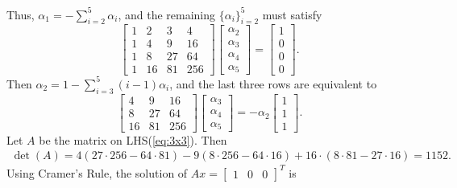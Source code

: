 \documentclass{homework}
\begin{document}
	Thus, $\alpha_1 = -\sum\limits_{i=2}^5 \alpha_i$, and the remaining $\{\alpha_i\}_{i=2}^5$ must satisfy
	\begin{equation}
		\left[\begin{matrix}
			1 & 2 & 3 & 4 \\
			1 & 4 & 9 & 16 \\
			1 & 8 & 27 & 64 \\
			1 & 16 & 81 & 256
		\end{matrix}\right]
		\left[\begin{matrix}
			\alpha_2 \\ \alpha_3 \\ \alpha_4 \\ \alpha_5
		\end{matrix}\right] =
		\left[\begin{matrix}
			1 \\ 0 \\ 0 \\ 0
		\end{matrix}\right].
	\end{equation}
	Then $\alpha_2 = 1-\sum\limits_{i=3}^5 (i-1)\alpha_i$, and the last three rows are equivalent to
	\begin{equation}
		\label{eq:3x3}
		\left[\begin{matrix}
			4 & 9 & 16 \\
			8 & 27 & 64 \\
			16 & 81 & 256
		\end{matrix}\right]\left[\begin{matrix}
		\alpha_3 \\ \alpha_4\\ \alpha_5
		\end{matrix}\right] = -\alpha_2\left[\begin{matrix}
		1\\1\\1
		\end{matrix}\right].
	\end{equation}
	Let $A$ be the matrix on LHS(\ref{eq:3x3}). Then 
	\begin{align*}
		\det(A) = 4(27\cdot 256 - 64\cdot 81) - 9(8 \cdot 256 - 64\cdot 16) + 16\cdot(8\cdot 81 - 27\cdot 16) = 1152.
	\end{align*}
	Using Cramer's Rule, the solution of $Ax = [\begin{matrix}1&0&0\end{matrix}]^T$ is 
\end{document}

